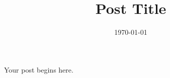 \documentclass[12pt]{article}
\title{Post Title}
\date{\today}
\begin{document}
\maketitle

Your post begins here.
\end{document}

